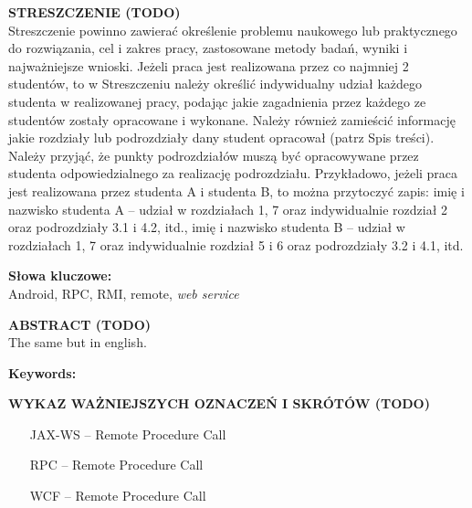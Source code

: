 \documentclass[twoside,a4paper]{book}
\begin{document}



{\noindent \large \textbf{STRESZCZENIE (TODO)}} \\
Streszczenie powinno zawierać określenie problemu naukowego lub praktycznego do rozwiązania, cel i zakres pracy, zastosowane metody badań, wyniki i najważniejsze wnioski.
Jeżeli praca jest realizowana przez co najmniej 2 studentów, to w Streszczeniu należy określić indywidualny udział każdego studenta w realizowanej pracy, podając jakie zagadnienia przez każdego ze studentów zostały opracowane i wykonane. Należy również zamieścić informację jakie rozdziały lub podrozdziały dany student opracował (patrz Spis treści). Należy przyjąć, że punkty podrozdziałów muszą być opracowywane przez studenta odpowiedzialnego za realizację podrozdziału. Przykładowo, jeżeli praca jest realizowana przez studenta A i studenta B, to można przytoczyć zapis: imię i nazwisko studenta A – udział w rozdziałach 1, 7 oraz indywidualnie rozdział 2 oraz podrozdziały 3.1 i 4.2, itd., imię i nazwisko studenta B – udział w rozdziałach 1, 7 oraz indywidualnie rozdział 5 i 6 oraz podrozdziały 3.2 i 4.1, itd.

\textbf{Słowa kluczowe:} \\
Android, RPC, RMI, remote, \emph{web service}
\clearpage

{\noindent \large \textbf{ABSTRACT (TODO)}} \\
The same but in english.

\textbf{Keywords:} \\
\clearpage

\tableofcontents

\clearpage
{\noindent \large \textbf{WYKAZ WAŻNIEJSZYCH OZNACZEŃ I SKRÓTÓW (TODO)}} \\
\begin{itemize}
  \item[JAX-WS --] Remote Procedure Call
	\item[RPC --] Remote Procedure Call 
	\item[WCF --] Remote Procedure Call
\end{itemize}
\clearpage

\mainmatter

%
\end{document}
